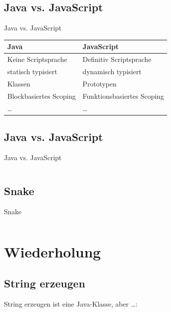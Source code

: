 \documentclass[usepdftitle=false,hyperref={pdfpagelabels=false}]{beamer}
\begin{document}
\subsection{Java vs. JavaScript}
\begin{frame}{Java vs. JavaScript}
    \begin{tabularx}{\textwidth}{X|X}
        Java                & JavaScript \\
        \hline
        \hline
        Keine Scriptsprache & Definitiv Scriptsprache\\
        statisch typisiert  & dynamisch typisiert\\
        Klassen             & Prototypen\\
        Blockbasiertes Scoping & Funktionsbasiertes Scoping\\
        \dots               & \dots
    \end{tabularx}
\end{frame}

\subsection{Java vs. JavaScript}
\begin{frame}{Java vs. JavaScript}
    \inputminted[linenos, numbersep=5pt, tabsize=4, frame=lines, label=comparisons.js, fontsize=\tiny]{javascript}{comparisons.js}
\end{frame}

\subsection{Snake}
\begin{frame}{Snake}
    \inputminted[linenos, numbersep=5pt, tabsize=4, frame=lines, label=comparisons.js, fontsize=\tiny,firstline=9,firstnumber=9]{javascript}{index.htm}
\end{frame}

\section{Wiederholung}
\subsection{String erzeugen}
\begin{frame}{String erzeugen}
   ist eine Java-Klasse, aber \dots:
  \inputminted[linenos, numbersep=5pt, tabsize=4]{java}{String-01.java}
\end{frame}
\end{document}
